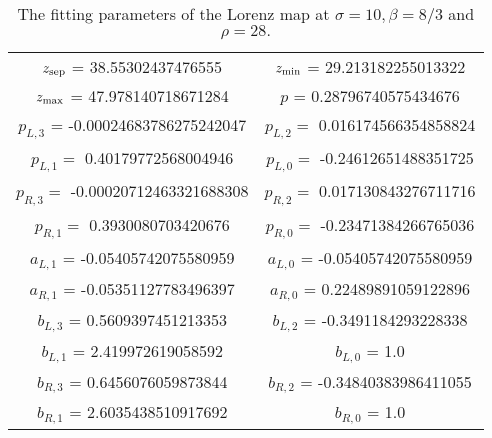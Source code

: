 \begin{table}[H]
    \centering
    \begin{tabular}{|c|c|}
    \hline 
         $z_{\rm sep}$ = 38.55302437476555 &
         $z_{\rm min}$ =  29.213182255013322 \\ 
         $z_{\rm max}$ =  47.978140718671284 & 
         $p$ = 0.28796740575434676   \\
         $p_{L,3}$ = -0.00024683786275242047 & $p_{L,2} = $ 
         0.016174566354858824 \\
         $p_{L,1} = $ 0.40179772568004946 & 
         $p_{L, 0}  = $ -0.24612651488351725 \\
         $p_{R,3} = $ -0.00020712463321688308 & 
         $p_{R,2} = $ 0.017130843276711716 \\
         $p_{R, 1} = $ 0.3930080703420676 & 
         $p_{R, 0} = $ -0.23471384266765036 \\
         $a_{L,1}$ = -0.05405742075580959 & $a_{L,0}$ = -0.05405742075580959 \\
         $a_{R,1}$ = -0.05351127783496397 & $a_{R,0}$ = 0.22489891059122896 \\
         $b_{L,3}$ = 0.5609397451213353 & $b_{L,2}$ = -0.3491184293228338 \\  $b_{L,1}$ = 2.419972619058592 & $b_{L,0}$ = 1.0 \\
         $b_{R,3}$ = 0.6456076059873844 & $b_{R,2}$ = -0.34840383986411055 \\ $b_{R,1}$ = 2.6035438510917692 &  $b_{R,0}$ = 1.0 \\
         \hline
    \end{tabular}
    \caption{The fitting parameters of the Lorenz map at $\sigma = 10, \beta = 8/3$ and $\rho = 28.$}
    \label{tab:my_label}
\end{table}

